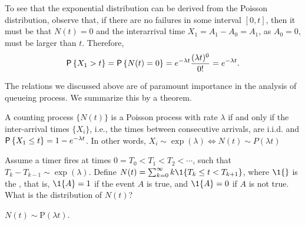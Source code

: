 To see that the exponential distribution can be derived from the Poisson distribution, observe that, if there are no failures in some interval $[0,t]$, then it
must be that $N(t) = 0$ and the interarrival time $X_1=A_1-A_0=A_1$, as
$A_0=0$, must be larger than $t$.  Therefore,
\begin{equation*}
 \P{X_1> t} = \P{N(t) = 0} = e^{-\lambda t} \frac{(\lambda t)^0}{0!}= e^{-\lambda t}.
\end{equation*}

The relations we discussed above are of paramount importance in the
analysis of queueing process. We summarize this by a theorem.
\begin{theorem}\label{thr:1}
  A counting process $\{N(t)\}$ is a Poisson process with rate $\lambda$ if and only if
  the inter-arrival times $\{X_i\}$, i.e., the times between consecutive
  arrivals, are i.i.d. and $\P{ X_1\leq t} = 1 - e^{-\lambda t}$. In other words, $X_i\sim \exp(\lambda) \Leftrightarrow N(t) \sim P(\lambda t)$ 
\end{theorem}



\begin{question}
  Assume a timer fires at times $0=T_0<T_1<T_2< \cdots$, such that
  $T_{k}-T_{k-1}\sim\exp(\lambda)$. Define
  $N(t) = \sum_{k=0}^\infty k \1{T_k \leq t < T_{k+1}}$, where $\1{}$
  is the , that is, $\1{A}=1$ if the event
  $A$ is true, and $\1{A}=0$ if $A$ is not true. What is the
  distribution of $N(t)$?
\begin{solution}
$N(t) \sim \text{P}(\lambda t)$. 
\end{solution}
\end{question}


